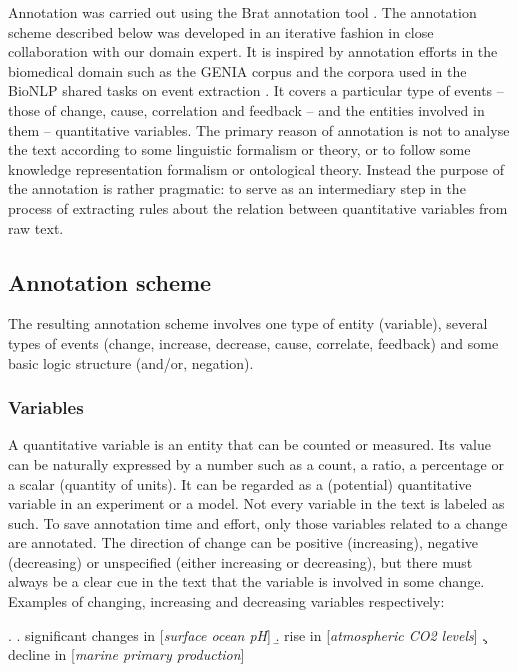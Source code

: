 \documentclass[10pt, a4paper]{article}
\begin{document}
Annotation was carried out using the Brat annotation tool \cite{stenetorp2012}.
The annotation scheme described below was developed in an iterative fashion in close collaboration with our domain expert.
It is inspired by annotation efforts in the biomedical domain such as the GENIA corpus \cite{Kim2003GENIA} and the corpora used in the BioNLP shared tasks on event extraction \cite{Kim2009Overview}.
It covers a particular type of events -- those of change, cause, correlation and feedback -- and the entities involved in them -- quantitative variables.
The primary reason of annotation is not to analyse the text according to some linguistic formalism or theory, or to follow some knowledge representation formalism or ontological theory.
Instead the purpose of the annotation is rather pragmatic: to serve as an intermediary step in the process of extracting rules about the relation between quantitative variables from raw text.      
 
\subsection{Annotation scheme}

The resulting annotation scheme involves one type of entity (variable), several types of events (change, increase, decrease, cause, correlate, feedback) and some basic logic structure (and/or, negation).  


\subsubsection{Variables}

A quantitative variable is an entity that can be counted or measured.
Its value can be naturally expressed by a number such as a count, a ratio, a percentage or a scalar (quantity of units).
It can be regarded as a (potential) quantitative variable in an experiment or a model. 
Not every variable in the text is labeled as such.
To save annotation time and effort, only those variables related to a change are annotated.
The  direction of change can be positive (increasing), negative (decreasing) or unspecified (either increasing or decreasing), but there must always be a clear cue in the text that the variable is involved in some change. 
Examples of changing, increasing and decreasing variables respectively:

\ex.
  \a. significant changes in [\emph{surface ocean pH}]
  \b. rise in [\emph{atmospheric CO2 levels}]
  \c. decline in [\emph{marine primary production}]
\end{document}
